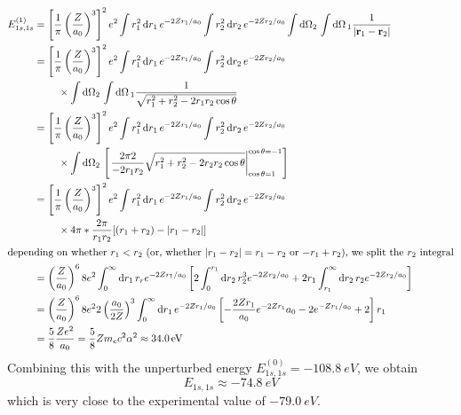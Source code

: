 \begin{align}
	E^{(1)}_{1s,1s} &= \left[\frac{1}{\pi}\left(\frac{Z}{a_0}\right)^3\right]^2e^2\int r_1^2\d{r_1} e^{-2Zr_1/a_0}\int r_2^2\d{r_2}e^{-2Zr_2/a_0}\int\d{\Omega_2}\int\d\Omega_1\frac{1}{\abs{\vb r_1-\vb r_2}}\nonumber\\
			&= \left[\frac{1}{\pi}\left(\frac{Z}{a_0}\right)^3\right]^2e^2\int r_1^2\d{r_1} e^{-2Zr_1/a_0}\int r_2^2\d{r_2}e^{-2Zr_2/a_0}\nonumber\\
			&\hphantom{===}\times\int\d{\Omega_2}\int\d\Omega_1\frac{1}{\sqrt{r_1^2+r_2^2-2r_1r_2\cos\theta}}\nonumber\\
			&= \left[\frac{1}{\pi}\left(\frac{Z}{a_0}\right)^3\right]^2e^2\int r_1^2\d{r_1} e^{-2Zr_1/a_0}\int r_2^2\d{r_2}e^{-2Zr_2/a_0}\nonumber\\
			&\hphantom{===}\times\int\d{\Omega_2}\eval{\frac{2\pi 2}{-2r_1r_2}\sqrt{r_1^2+r_2^2-2r_2r_2\cos\theta}}{\cos\theta=1}{\cos\theta=-1}\nonumber\\
			&= \left[\frac{1}{\pi}\left(\frac{Z}{a_0}\right)^3\right]^2e^2\int r_1^2\d{r_1} e^{-2Zr_1/a_0}\int r_2^2\d{r_2}e^{-2Zr_2/a_0}\nonumber\\
			&\hphantom{===}\times4\pi * \frac{2\pi}{r_1r_2}[(r_1+r_2)-\abs{r_1-r_2}]\nonumber\\
			\intertext{depending on whether \(r_1<r_2\) (or, whether \(\abs{r_1-r_2}=r_1-r_2\) or \(-r_1+r_2\)), we split the \(r_2\) integral}
			&=\left(\frac{Z}{a_0}\right)^6 8e^2\int_0^\infty \d{r_1}r_r e^{-2Zr_1/a_0} \left[2\int_0^{r_1}\d{r_2}r_2^3e^{-2Zr_2/a_0} + 2r_1\int_{r_1}^\infty \d{r_2}r_2 e^{-2Zr_2/a_0}\right]\nonumber\\
			&=\left(\frac{Z}{a_0}\right)^6 8e^2 2 \left(\frac{a_0}{2Z}\right)^3\int_0^\infty\d{r_1}e^{-2Zr_1/a_0}\left[-\frac{2Zr_1}{a_0}e^{-2Zr_1}{a_0} - 2 e^{-Zr_1/a_0} + 2\right]r_1\nonumber\\
			&=\frac{5}{8}\frac{Ze^2}{a_0} = \frac{5}{8}Zm_ec^2\alpha^2 \approx \SI{34.0}{eV}\label{eq12:HePert}
\end{align}
Combining this with the unperturbed energy \(E^{(0)}_{1s,1s} = -\SI{108.8}{eV}\), we obtain
\[E_{1s,1s} \approx -\SI{74.8}{eV}\]
which is very close to the experimental value of \(-\SI{79.0}{eV}\).

